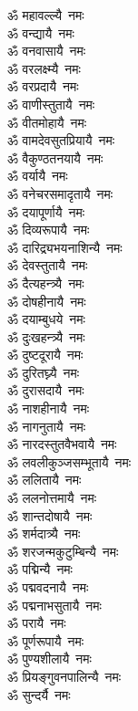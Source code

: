 \begin{flushleft}
\begin{multicols}{2}
ॐ महावल्ल्यै~नमः\\
ॐ वन्द्यायै~नमः\\
ॐ वनवासायै~नमः\\
ॐ वरलक्ष्म्यै~नमः\\
ॐ वरप्रदायै~नमः\\
ॐ वाणीस्तुतायै~नमः\\
ॐ वीतमोहायै~नमः\\
ॐ वामदेवसुतप्रियायै~नमः\\
ॐ वैकुण्ठतनयायै~नमः\\
ॐ वर्यायै~नमः\hfill{}\\
ॐ वनेचरसमादृतायै~नमः\\
ॐ दयापूर्णायै~नमः\\
ॐ दिव्यरूपायै~नमः\\
ॐ दारिद्र्यभयनाशिन्यै~नमः\\
ॐ देवस्तुतायै~नमः\\
ॐ दैत्यहन्त्र्यै~नमः\\
ॐ दोषहीनायै~नमः\\
ॐ दयाम्बुधये~नमः\\
ॐ दुःखहन्त्र्यै~नमः\\
ॐ दुष्टदूरायै~नमः\hfill{}\\
ॐ दुरितघ्न्यै~नमः\\
ॐ दुरासदायै~नमः\\
ॐ नाशहीनायै~नमः\\
ॐ नागनुतायै~नमः\\
ॐ नारदस्तुतवैभवायै~नमः\\
ॐ लवलीकुञ्जसम्भूतायै~नमः\\
ॐ ललितायै~नमः\\
ॐ ललनोत्तमायै~नमः\\
ॐ शान्तदोषायै~नमः\\
ॐ शर्मदात्र्यै~नमः\hfill{}\\
ॐ शरजन्मकुटुम्बिन्यै~नमः\\
ॐ पद्मिन्यै~नमः\\
ॐ पद्मवदनायै~नमः\\
ॐ पद्मनाभसुतायै~नमः \\
ॐ परायै~नमः\\
ॐ पूर्णरूपायै~नमः\\
ॐ पुण्यशीलायै~नमः\\
ॐ प्रियङ्गुवनपालिन्यै~नमः\\
ॐ सुन्दर्यै~नमः\\

\end{multicols}
\end{flushleft}
